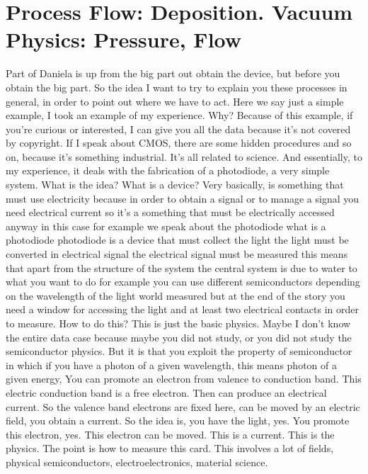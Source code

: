 \chapter{Process Flow: Deposition. Vacuum Physics: Pressure, Flow}
Part of Daniela is up from the big part out obtain the device, but before you obtain the big part. So the idea I want to try to explain you these processes in general, in order to point out where we have to act. Here we say just a simple example, I took an example of my experience. Why? Because of this example, if you're curious or interested, I can give you all the data because it's not covered by copyright. If I speak about CMOS, there are some hidden procedures and so on, because it's something industrial. It's all related to science. And essentially, to my experience, it deals with the fabrication of a photodiode, a very simple system.
What is the idea? What is a device? Very basically, is something that must use electricity because in order to obtain a signal or to manage a signal you need electrical current so it's a something that must be electrically accessed anyway in this case for example we speak about the photodiode what is a photodiode photodiode is a device that must collect the light the light must be converted in electrical signal the electrical signal must be measured this means that apart from the structure of the system the central system is due to water to what you want to do for example you can use different semiconductors depending on the wavelength of the light world measured but at the end of the story you need a window for accessing the light and at least two electrical contacts in order to measure. How to do this? This is just the basic physics. Maybe I don't know the entire data case because maybe you did not study, or you did not study the semiconductor physics. But it is that you exploit the property of semiconductor in which if you have a photon of a given wavelength, this means photon of a given energy, You can promote an electron from valence to conduction band. This electric conduction band is a free electron. Then can produce an electrical current. So the valence band electrons are fixed here, can be moved by an electric field, you obtain a current. So the idea is, you have the light, yes. You promote this electron, yes. This electron can be moved. This is a current. This is the physics. The point is how to measure this card. This involves a lot of fields, physical semiconductors, electroelectronics, material science.
